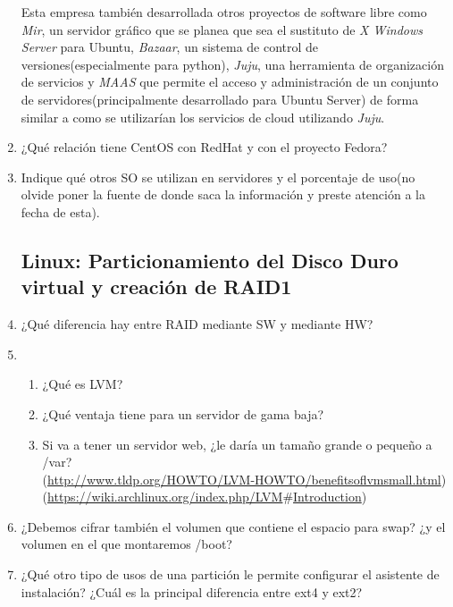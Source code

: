 \documentclass[paper=a4, fontsize=11pt]{scrartcl} %
\numberwithin{equation}{section} %
\numberwithin{figure}{section} %
\numberwithin{table}{section} %
\begin{document}
\begin{enumerate}
		Esta empresa también desarrollada otros proyectos de software libre como \textit{Mir}, un
		servidor gráfico que se planea que sea el sustituto de \textit{X Windows Server} para Ubuntu,
		\textit{Bazaar}, un sistema de control de versiones(especialmente para python), \textit{Juju},
		una herramienta de organización de servicios y \textit{MAAS}\cite{MAAS} que permite el acceso
		y administración de un conjunto de servidores(principalmente desarrollado para Ubuntu Server)
		de forma similar a como se utilizarían los servicios de cloud utilizando \textit{Juju}.
		
		\item ¿Qué relación tiene CentOS con RedHat y con el proyecto Fedora?
		
		\item Indique qué otros SO se utilizan en servidores y el porcentaje de uso(no olvide poner
		la fuente de donde saca la información y preste atención a la fecha de esta).
		
	\subsection{Linux: Particionamiento del Disco Duro virtual y creación de RAID1}
		\item ¿Qué diferencia hay entre RAID mediante SW y mediante HW?\\
		
		\item \begin{enumerate}
			\item ¿Qué es LVM?
			
			\item ¿Qué ventaja tiene para un servidor de gama baja?
			
			\item Si va a tener un servidor web, ¿le daría un tamaño grande o pequeño a /var?\\
			(\href{http://www.tldp.org/HOWTO/LVM-HOWTO/benefitsoflvmsmall.html}
			{http://www.tldp.org/HOWTO/LVM-HOWTO/benefitsoflvmsmall.html})
			(\href{https://wiki.archlinux.org/index.php/LVM#Introduction}
			{https://wiki.archlinux.org/index.php/LVM$\#$Introduction})\\
		\end{enumerate}
		
		\item ¿Debemos cifrar también el volumen que contiene el espacio para swap? ¿y el volumen
		en el que montaremos /boot?
		
		\item ¿Qué otro tipo de usos de una partición le permite configurar el asistente de instalación?
		¿Cuál es la principal diferencia entre ext4 y ext2?
		

\end{enumerate}
\end{document}
